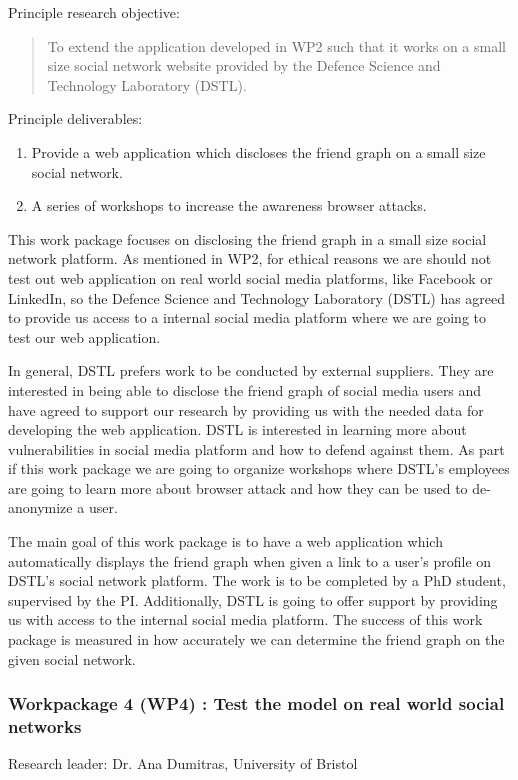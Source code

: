 \documentclass[a4paper,11pt]{article}
\begin{document}
Principle research objective:
\begin{quote}
	To extend the application developed in WP2 such that it works on a small size social network website provided by the Defence Science and Technology Laboratory (DSTL).
\end{quote}

Principle deliverables:
\begin{enumerate}
\item Provide a web application which discloses the friend graph on a small size social network.
\item A series of workshops to increase the awareness browser attacks.
\end{enumerate}

This work package focuses on disclosing the friend graph in a small size social network platform. As mentioned in WP2, for ethical reasons we are should not test out web application on real world social media platforms, like Facebook or LinkedIn, so the Defence Science and Technology Laboratory (DSTL) has agreed to provide us access to a internal social media platform where we are going to test our web application. 

In general, DSTL prefers work to be conducted by external suppliers. They are interested in being able to disclose the friend graph of social media users and have agreed to support our research by providing us with the needed data for developing the web application. DSTL is interested in learning more about vulnerabilities in social media platform and how to defend against them. As part if this work package we are going to organize workshops where DSTL's employees are going to learn more about browser attack and how they can be used to de-anonymize a user. 

The main goal of this work package is to have a web application which automatically displays the friend graph when given a link to a user's profile on DSTL's social network platform. The work is to be completed by a PhD student, supervised by the PI. Additionally, DSTL is going to offer support by providing us with access to the internal social media platform. The success of this work package is measured in how accurately we can determine the friend graph on the given social network.

\subsubsection*{Workpackage 4 (WP4) : Test the model on real world social networks}
Research leader: Dr. Ana Dumitras, University of Bristol
\end{document}
